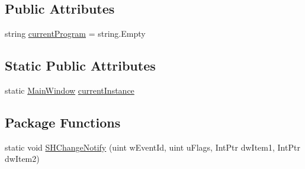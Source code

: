 \subsection*{Public Attributes}
\begin{DoxyCompactItemize}
\item 
string \hyperlink{class_c_p_u___o_s___simulator_1_1_main_window_a91f063d9cf776004dc74e719ef942907}{current\+Program} = string.\+Empty
\end{DoxyCompactItemize}
\subsection*{Static Public Attributes}
\begin{DoxyCompactItemize}
\item 
static \hyperlink{class_c_p_u___o_s___simulator_1_1_main_window}{Main\+Window} \hyperlink{class_c_p_u___o_s___simulator_1_1_main_window_a1280266cc57403a91f08a8350dee05cc}{current\+Instance}
\end{DoxyCompactItemize}
\subsection*{Package Functions}
\begin{DoxyCompactItemize}
\item 
static void \hyperlink{class_c_p_u___o_s___simulator_1_1_main_window_a0bbdb2d3b0e818f2d264770168521059}{S\+H\+Change\+Notify} (uint w\+Event\+Id, uint u\+Flags, Int\+Ptr dw\+Item1, Int\+Ptr dw\+Item2)
\end{DoxyCompactItemize}

